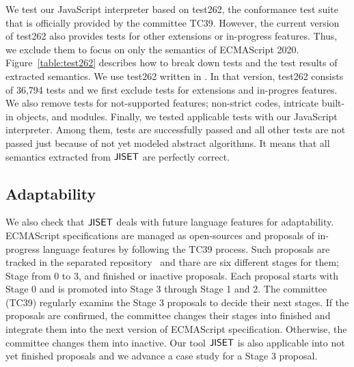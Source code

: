 We test our JavaScript interpreter based on test262, the conformance test suite
that is officially provided by the committee TC39. However, the current version of
test262 also provides tests for other extensions or in-progress features.
Thus, we exclude them to focus on only the semantics of ECMAScript 2020.
Figure~\ref{table:test262} describes how to break down tests and the test results of extracted
semantics. We use test262 written in . In that version,
test262 consists of 36,794 tests and we first exclude  tests
for extensions and in-progres features. We also remove  tests for
not-supported features; non-strict codes, intricate built-in objects, and modules.
Finally, we tested  applicable tests with our JavaScript interpreter.
Among them,  tests are successfully passed and all other tests are
not passed just because of not yet modeled abstract algorithms. It means that
all semantics extracted from \( \text{\sf JISET} \) are perfectly correct.


\subsection{Adaptability}

We also check that \( \text{\sf JISET} \) deals with future language features for adaptability.
ECMAScript specifications are managed as open-sources and proposals of in-progress language
features by following the TC39 process. Such proposals are tracked in the separated repository~\cite{proposals}
and thare are six different stages for them; Stage from 0 to 3, and finished or inactive proposals.
Each proposal starts with Stage 0 and is promoted into Stage 3 through Stage 1 and 2.
The committee (TC39) regularly examins the Stage 3 proposals to decide their next stages.
If the proposals are confirmed, the committee changes their stages into finished
and integrate them into the next version of ECMAScript specification.
Otherwise, the committee changes them into inactive. Our tool \( \text{\sf JISET} \) is also applicable
into not yet finished proposals and we advance a case study for a Stage 3 proposal.

